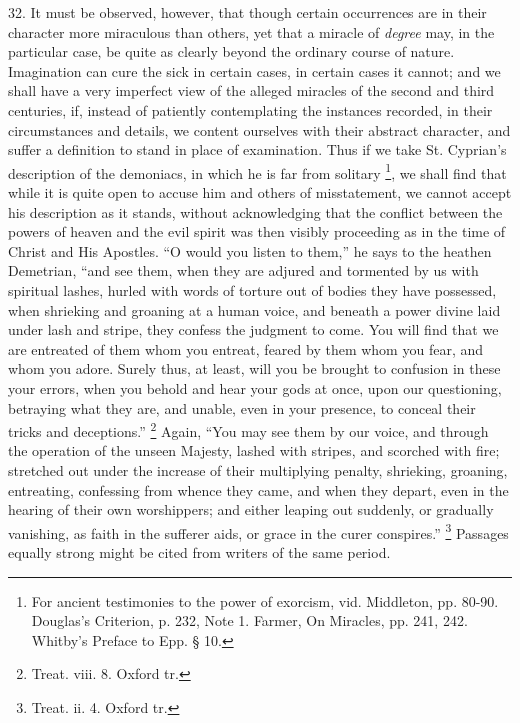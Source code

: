 32.
It must be observed, however, that though certain occurrences
are in their character more miraculous than others, yet that a miracle
of \emph{degree} may, in the particular case, be quite as clearly
beyond the ordinary course of nature. Imagination can cure the sick in
certain cases, in certain cases it cannot; and we shall have a very
imperfect view of the alleged miracles of the second and third
centuries, if, instead of patiently contemplating the instances
recorded, in their circumstances and details, we content ourselves
with their abstract character, and suffer a definition to stand in
place of examination. Thus if we take St. Cyprian's description of the
demoniacs, in which he is far from solitary \footnote{For ancient testimonies to the power of
exorcism, vid. Middleton, pp. 80-90. Douglas's Criterion, p. 232, Note
1. Farmer, On Miracles, pp. 241, 242. Whitby's Preface to Epp. § 10.}, we shall find
that while it is quite open to accuse him and others of misstatement,
we cannot accept his description as it stands, without acknowledging
that the conflict between the powers of heaven and the evil spirit was
then visibly proceeding as in the time of Christ and His Apostles.
``O would you listen to them,'' he says to the heathen Demetrian, ``and
see them, when they are adjured and tormented by us with spiritual
lashes, hurled with words of torture out of bodies they have
possessed, when shrieking and groaning at a human voice, and beneath a
power divine laid under lash and stripe, they confess the
judgment to come. You will find that we are entreated of them whom you
entreat, feared by them whom you fear, and whom you adore. Surely
thus, at least, will you be brought to confusion in these your errors,
when you behold and hear your gods at once, upon our questioning,
betraying what they are, and unable, even in your presence, to conceal
their tricks and deceptions.'' \footnote{Treat. viii. 8. Oxford tr.} Again, ``You may see them
by our voice, and through the operation of the unseen Majesty, lashed
with stripes, and scorched with fire; stretched out under the increase
of their multiplying penalty, shrieking, groaning, entreating,
confessing from whence they came, and when they depart, even in the
hearing of their own worshippers; and either leaping out suddenly, or
gradually vanishing, as faith in the sufferer aids, or grace in the
curer conspires.'' \footnote{Treat. ii. 4. Oxford tr.} Passages equally strong might be cited
from writers of the same period.

